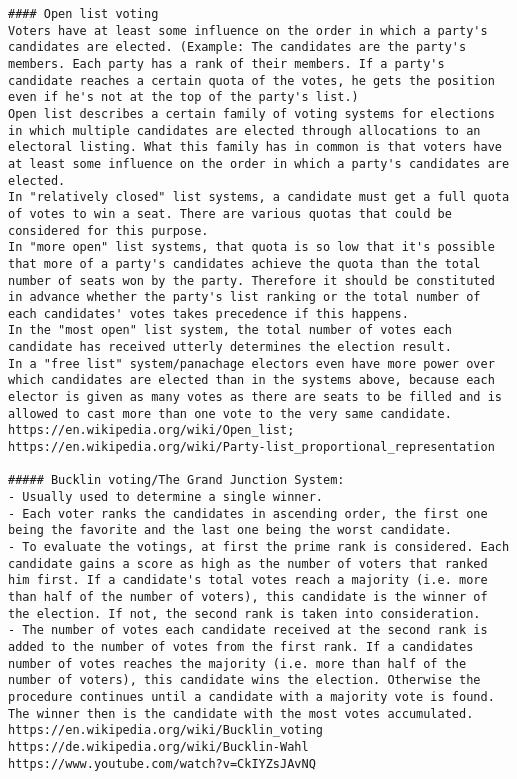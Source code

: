 {{\begin{verbatim}
#### Open list voting
Voters have at least some influence on the order in which a party's candidates are elected. (Example: The candidates are the party's members. Each party has a rank of their members. If a party's candidate reaches a certain quota of the votes, he gets the position even if he's not at the top of the party's list.) 
Open list describes a certain family of voting systems for elections in which multiple candidates are elected through allocations to an electoral listing. What this family has in common is that voters have at least some influence on the order in which a party's candidates are elected. 
In "relatively closed" list systems, a candidate must get a full quota of votes to win a seat. There are various quotas that could be considered for this purpose. 
In "more open" list systems, that quota is so low that it's possible that more of a party's candidates achieve the quota than the total number of seats won by the party. Therefore it should be constituted in advance whether the party's list ranking or the total number of each candidates' votes takes precedence if this happens.
In the "most open" list system, the total number of votes each candidate has received utterly determines the election result. 
In a "free list" system/panachage electors even have more power over which candidates are elected than in the systems above, because each elector is given as many votes as there are seats to be filled and is allowed to cast more than one vote to the very same candidate.
https://en.wikipedia.org/wiki/Open_list; https://en.wikipedia.org/wiki/Party-list_proportional_representation

##### Bucklin voting/The Grand Junction System: 
- Usually used to determine a single winner. 
- Each voter ranks the candidates in ascending order, the first one being the favorite and the last one being the worst candidate. 
- To evaluate the votings, at first the prime rank is considered. Each candidate gains a score as high as the number of voters that ranked him first. If a candidate's total votes reach a majority (i.e. more than half of the number of voters), this candidate is the winner of the election. If not, the second rank is taken into consideration. 
- The number of votes each candidate received at the second rank is added to the number of votes from the first rank. If a candidates number of votes reaches the majority (i.e. more than half of the number of voters), this candidate wins the election. Otherwise the procedure continues until a candidate with a majority vote is found. The winner then is the candidate with the most votes accumulated.
https://en.wikipedia.org/wiki/Bucklin_voting 
https://de.wikipedia.org/wiki/Bucklin-Wahl
https://www.youtube.com/watch?v=CkIYZsJAvNQ


\end{verbatim}}}
